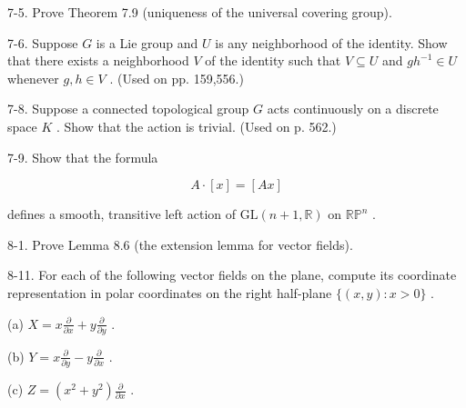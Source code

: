 \begin{exercise}
\label{prob:7-5}


7-5. Prove Theorem 7.9 (uniqueness of the universal covering group).
\end{exercise}

\begin{exercise}
\label{prob:7-6}


7-6. Suppose $G$ is a Lie group and $U$ is any neighborhood of the identity. Show that there exists a neighborhood $V$ of the identity such that $V \subseteq  U$ and $g{h}^{-1} \in  U$ whenever $g, h \in  V$ . (Used on pp. 159,556.)
\end{exercise}

\begin{exercise}
\label{prob:7-8}


7-8. Suppose a connected topological group $G$ acts continuously on a discrete space $K$ . Show that the action is trivial. (Used on p. 562.)
\end{exercise}

\begin{exercise}
\label{prob:7-9}


7-9. Show that the formula

\[
A \cdot  \left\lbrack  x\right\rbrack   = \left\lbrack  {Ax}\right\rbrack
\]

defines a smooth, transitive left action of $\mathrm{{GL}}\left( {n + 1,\mathbb{R}}\right)$ on ${\mathbb{{RP}}}^{n}$ .
\end{exercise}

\begin{exercise}
\label{prob:8-1}


8-1. Prove Lemma 8.6 (the extension lemma for vector fields).
\end{exercise}

\begin{exercise}
\label{prob:8-11}


8-11. For each of the following vector fields on the plane, compute its coordinate representation in polar coordinates on the right half-plane $\{ \left( {x, y}\right)  : x > 0\}$ .

(a) $X = x\frac{\partial }{\partial x} + y\frac{\partial }{\partial y}$ .

(b) $Y = x\frac{\partial }{\partial y} - y\frac{\partial }{\partial x}$ .

(c) $Z = \left( {{x}^{2} + {y}^{2}}\right) \frac{\partial }{\partial x}$ .
\end{exercise}


